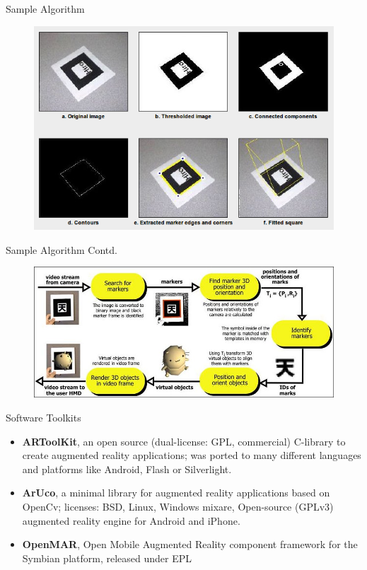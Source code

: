 \documentclass{beamer}
\begin{document}
\begin{frame}{Sample Algorithm}
	\begin{figure}
		\includegraphics[scale=.50]{algorithm1.png}\\
	\end{figure}
\end{frame}


\begin{frame}{Sample Algorithm Contd.}
	\begin{figure}
		\includegraphics[scale=1.3]{flow.jpg}\\
	\end{figure}
\end{frame}


\begin{frame}{Software Toolkits}
	\begin{itemize}
		\item \textbf{ARToolKit}, an open source (dual-license: GPL, commercial) C-library to create augmented reality applications; was ported to many different languages and platforms like Android, Flash or Silverlight.
		\item \textbf{ArUco}, a minimal library for augmented reality applications based on OpenCv; licenses: BSD, Linux, Windows
mixare, Open-source (GPLv3) augmented reality engine for Android and iPhone.
		\item \textbf{OpenMAR}, Open Mobile Augmented Reality component framework for the Symbian platform, released under EPL
	\end{itemize}
\end{frame}
\end{document}
